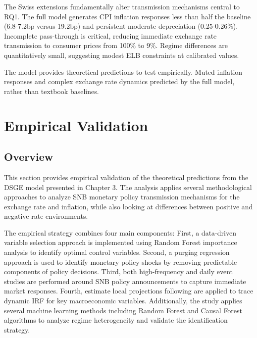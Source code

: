 \documentclass[12pt,a4paper]{article}
\begin{document}
The Swiss extensions fundamentally alter transmission mechanisms central to RQ1. The full model generates CPI inflation responses less than half the baseline (6.8-7.2bp versus 19.2bp) and persistent moderate depreciation (0.25-0.26\%). Incomplete pass-through is critical, reducing immediate exchange rate transmission to consumer prices from 100\% to 9\%. Regime differences are quantitatively small, suggesting modest ELB constraints at calibrated values.

The model provides theoretical predictions to test empirically. Muted inflation responses and complex exchange rate dynamics predicted by the full model, rather than textbook baselines.
\newpage

\section{Empirical Validation}
\label{sec:empirical}

\subsection{Overview}
\label{subsec:empirical_overview}

This section provides empirical validation of the theoretical predictions from the DSGE model presented in Chapter 3. The analysis applies several methodological approaches to analyze SNB monetary policy transmission mechanisms for the exchange rate and inflation, while also looking at differences between positive and negative rate environments.

The empirical strategy combines four main components: First, a data-driven variable selection approach is implemented using Random Forest importance analysis to identify optimal control variables. Second, a purging regression approach is used to identify monetary policy shocks by removing predictable components of policy decisions. Third, both high-frequency and daily event studies are performed around SNB policy announcements to capture immediate market responses. Fourth, estimate local projections following \citet{jorda2005} are applied to trace dynamic IRF for key macroeconomic variables. Additionally, the study applies several machine learning methods including Random Forest and Causal Forest algorithms to analyze regime heterogeneity and validate the identification strategy.
\end{document}

